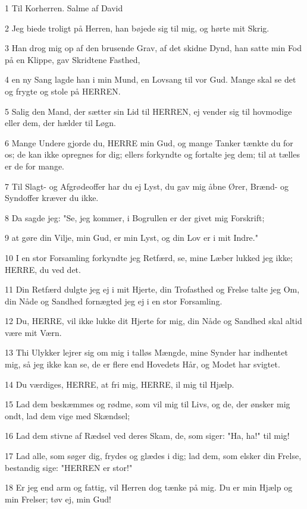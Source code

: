 \par 1 Til Korherren. Salme af David
\par 2 Jeg biede troligt på Herren, han bøjede sig til mig, og hørte mit Skrig.
\par 3 Han drog mig op af den brusende Grav, af det skidne Dynd, han satte min Fod på en Klippe, gav Skridtene Fasthed,
\par 4 en ny Sang lagde han i min Mund, en Lovsang til vor Gud. Mange skal se det og frygte og stole på HERREN.
\par 5 Salig den Mand, der sætter sin Lid til HERREN, ej vender sig til hovmodige eller dem, der hælder til Løgn.
\par 6 Mange Undere gjorde du, HERRE min Gud, og mange Tanker tænkte du for os; de kan ikke opregnes for dig; ellers forkyndte og fortalte jeg dem; til at tælles er de for mange.
\par 7 Til Slagt- og Afgrødeoffer har du ej Lyst, du gav mig åbne Ører, Brænd- og Syndoffer kræver du ikke.
\par 8 Da sagde jeg: "Se, jeg kommer, i Bogrullen er der givet mig Forskrift;
\par 9 at gøre din Vilje, min Gud, er min Lyst, og din Lov er i mit Indre."
\par 10 I en stor Forsamling forkyndte jeg Retfærd, se, mine Læber lukked jeg ikke; HERRE, du ved det.
\par 11 Din Retfærd dulgte jeg ej i mit Hjerte, din Trofasthed og Frelse talte jeg Om, din Nåde og Sandhed fornægted jeg ej i en stor Forsamling.
\par 12 Du, HERRE, vil ikke lukke dit Hjerte for mig, din Nåde og Sandhed skal altid være mit Værn.
\par 13 Thi Ulykker lejrer sig om mig i talløs Mængde, mine Synder har indhentet mig, så jeg ikke kan se, de er flere end Hovedets Hår, og Modet har svigtet.
\par 14 Du værdiges, HERRE, at fri mig, HERRE, il mig til Hjælp.
\par 15 Lad dem beskæmmes og rødme, som vil mig til Livs, og de, der ønsker mig ondt, lad dem vige med Skændsel;
\par 16 Lad dem stivne af Rædsel ved deres Skam, de, som siger: "Ha, ha!" til mig!
\par 17 Lad alle, som søger dig, frydes og glædes i dig; lad dem, som elsker din Frelse, bestandig sige: "HERREN er stor!"
\par 18 Er jeg end arm og fattig, vil Herren dog tænke på mig. Du er min Hjælp og min Frelser; tøv ej, min Gud!

